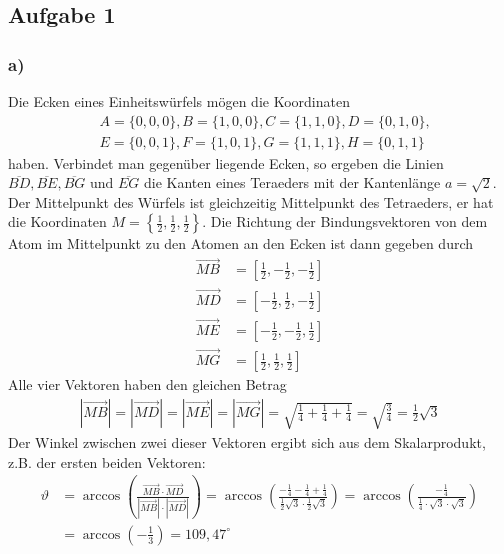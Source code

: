 \documentclass[11pt]{article}
\begin{document}
\subsection*{Aufgabe 1}

\subsubsection*{a)}Die Ecken eines Einheitswürfels mögen die Koordinaten
\begin{align*}
&A = \{0,0,0\}, B = \{1,0,0\}, C = \{1,1,0\}, D = \{0,1,0\},\\
&E = \{0,0,1\}, F = \{1,0,1\}, G = \{1,1,1\}, H = \{0,1,1\}
\end{align*}
haben. Verbindet man gegenüber liegende Ecken, so ergeben die Linien $\overline{BD}, \overline{BE}, \overline{BG} \text{ und } \overline{EG}$ die Kanten eines Teraeders mit der Kantenlänge $a = \sqrt{2}$. Der Mittelpunkt des Würfels ist gleichzeitig
Mittelpunkt des Tetraeders, er hat die Koordinaten
$M = \left\{\frac{1}{2}, \frac{1}{2}, \frac{1}{2}\right\}$. Die Richtung der Bindungsvektoren
von dem Atom im Mittelpunkt zu den Atomen an den Ecken ist dann gegeben durch
\begin{align*}
\overrightarrow{MB} &= \left[\frac{1}{2}, -\frac{1}{2}, -\frac{1}{2}\right]\\
\overrightarrow{MD} &= \left[-\frac{1}{2}, \frac{1}{2}, -\frac{1}{2}\right]\\
\overrightarrow{ME} &= \left[-\frac{1}{2}, -\frac{1}{2}, \frac{1}{2}\right]\\
\overrightarrow{MG} &= \left[\frac{1}{2}, \frac{1}{2}, \frac{1}{2}\right]
\end{align*}
Alle vier Vektoren haben den gleichen Betrag
\begin{align}
\label{eq-betrag}
\left|\overrightarrow{MB}\right| = \left|\overrightarrow{MD}\right| =
\left|\overrightarrow{ME}\right| = \left|\overrightarrow{MG}\right| =
\sqrt{\frac{1}{4}+\frac{1}{4}+\frac{1}{4}} = \sqrt{\frac{3}{4}} = \frac{1}{2} \sqrt{3}
\end{align}
Der Winkel zwischen zwei dieser Vektoren ergibt sich aus dem Skalarprodukt,
z.B. der ersten beiden Vektoren:
\begin{align*}
  \vartheta &= \arccos \left(\frac {\overrightarrow{MB} \cdot \overrightarrow{MD}}
  {\left|\overrightarrow{MB}\right| \cdot \left|\overrightarrow{MD}\right|} \right) =
  \arccos  \left(\frac{-\frac{1}{4}-\frac{1}{4}+\frac{1}{4}}
    {\frac{1}{2} \sqrt{3} \cdot \frac{1}{2} \sqrt{3}} \right)
    = \arccos \left(\frac{-\frac{1}{4}}{\frac{1}{4} \cdot  \sqrt{3} \cdot \sqrt{3}} \right)
    \\&= \arccos \left( -\frac{1}{3} \right) = 109,47^{\circ}
\end{align*}
\end{document}
